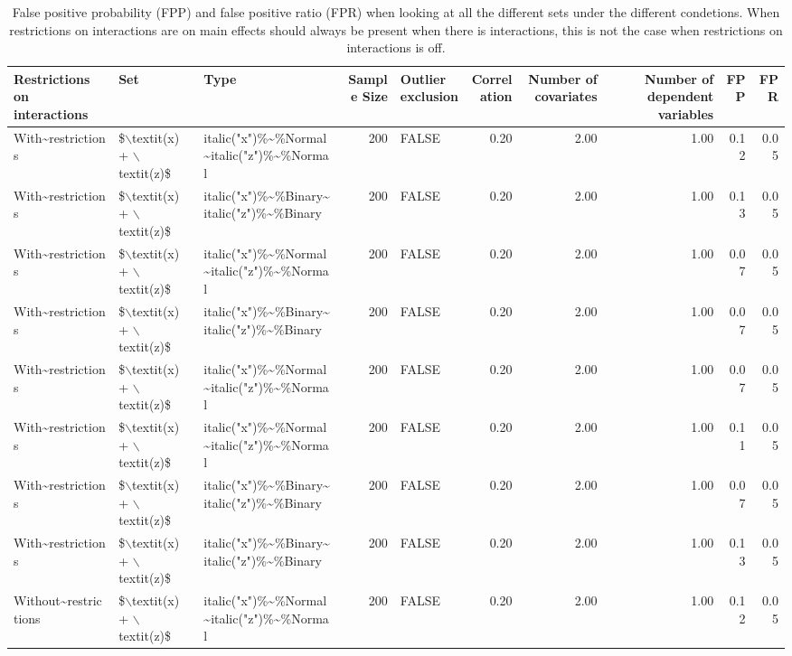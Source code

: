 \begin{longtable}{lllrlrrrrr}
\caption{False positive probability (FPP) and false positive ratio (FPR) when looking at all the different sets under the different condetions. When restrictions on interactions are on main effects should always be present when there is interactions, this is not the case when restrictions on interactions is off.} \\ 
  \hline
Restrictions on interactions & Set & Type & Sample Size & Outlier exclusion & Correlation & Number of covariates & Number of dependent variables & FPP & FPR \\ 
  \hline
With\~{}restrictions & \$$\backslash$textit(x) + $\backslash$textit(z)\$ & italic("x")\%\~{}\%Normal\~{}italic("z")\%\~{}\%Normal & 200 & FALSE & 0.20 & 2.00 & 1.00 & 0.12 & 0.05 \\ 
  With\~{}restrictions & \$$\backslash$textit(x) + $\backslash$textit(z)\$ & italic("x")\%\~{}\%Binary\~{}italic("z")\%\~{}\%Binary & 200 & FALSE & 0.20 & 2.00 & 1.00 & 0.13 & 0.05 \\ 
  With\~{}restrictions & \$$\backslash$textit(x) + $\backslash$textit(z)\$ & italic("x")\%\~{}\%Normal\~{}italic("z")\%\~{}\%Normal & 200 & FALSE & 0.20 & 2.00 & 1.00 & 0.07 & 0.05 \\ 
  With\~{}restrictions & \$$\backslash$textit(x) + $\backslash$textit(z)\$ & italic("x")\%\~{}\%Binary\~{}italic("z")\%\~{}\%Binary & 200 & FALSE & 0.20 & 2.00 & 1.00 & 0.07 & 0.05 \\ 
  With\~{}restrictions & \$$\backslash$textit(x) + $\backslash$textit(z)\$ & italic("x")\%\~{}\%Normal\~{}italic("z")\%\~{}\%Normal & 200 & FALSE & 0.20 & 2.00 & 1.00 & 0.07 & 0.05 \\ 
  With\~{}restrictions & \$$\backslash$textit(x) + $\backslash$textit(z)\$ & italic("x")\%\~{}\%Normal\~{}italic("z")\%\~{}\%Normal & 200 & FALSE & 0.20 & 2.00 & 1.00 & 0.11 & 0.05 \\ 
  With\~{}restrictions & \$$\backslash$textit(x) + $\backslash$textit(z)\$ & italic("x")\%\~{}\%Binary\~{}italic("z")\%\~{}\%Binary & 200 & FALSE & 0.20 & 2.00 & 1.00 & 0.07 & 0.05 \\ 
  With\~{}restrictions & \$$\backslash$textit(x) + $\backslash$textit(z)\$ & italic("x")\%\~{}\%Binary\~{}italic("z")\%\~{}\%Binary & 200 & FALSE & 0.20 & 2.00 & 1.00 & 0.13 & 0.05 \\ 
  Without\~{}restrictions & \$$\backslash$textit(x) + $\backslash$textit(z)\$ & italic("x")\%\~{}\%Normal\~{}italic("z")\%\~{}\%Normal & 200 & FALSE & 0.20 & 2.00 & 1.00 & 0.12 & 0.05 \\ 

\end{longtable}

